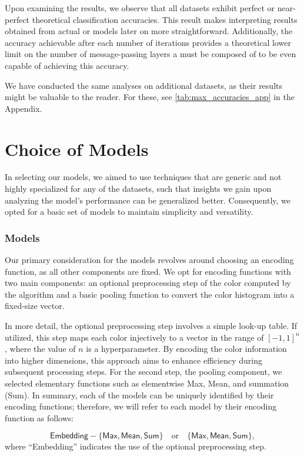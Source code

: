 Upon examining the results, we observe that all datasets exhibit perfect or near-perfect theoretical classification accuracies. This result makes interpreting results obtained from actual \wlnn or \gnn models later on more straightforward. Additionally, the accuracy achievable after each number of iterations provides a theoretical lower limit on the number of message-passing layers a \gnn must be composed of to be even capable of achieving this accuracy. 

We have conducted the same analyses on additional datasets, as their results might be valuable to the reader. For these, see \cref{tab:max_accuracies_app} in the Appendix.

\section{Choice of Models}
In selecting our models, we aimed to use techniques that are generic and not highly specialized for any of the datasets, such that insights we gain upon analyzing the model's performance can be generalized better. Consequently, we opted for a basic set of models to maintain simplicity and versatility.

\subsubsection{\wlnn Models}
Our primary consideration for the \wlnn models revolves around choosing an encoding function, as all other components are fixed. We opt for encoding functions with two main components: an optional preprocessing step of the color computed by the \wl algorithm and a basic pooling function to convert the color histogram into a fixed-size vector.

In more detail, the optional preprocessing step involves a simple look-up table. If utilized, this step maps each color injectively to a vector in the range of $[-1, 1]^n$, where the value of $n$ is a hyperparameter. By encoding the color information into higher dimensions, this approach aims to enhance efficiency during subsequent processing steps. For the second step, the pooling component, we selected elementary functions such as elementwise \textsf{Max}, \textsf{Mean}, and summation (\textsf{Sum}). In summary, each of the \wlnn models can be uniquely identified by their encoding functions; therefore, we will refer to each model by their encoding function as follows:


\begin{equation*}
	\textsf{Embedding}-\{\textsf{Max}, \textsf{Mean}, \textsf{Sum}\} \quad \text{or} \quad \{\textsf{Max}, \textsf{Mean}, \textsf{Sum}\},
\end{equation*}
where ``\textsf{Embedding}'' indicates the use of the optional preprocessing step.

